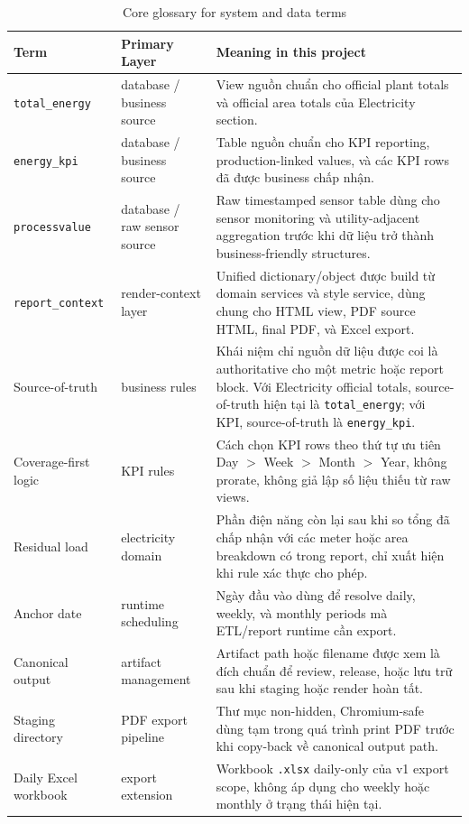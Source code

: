 \begin{table}[htbp]
	\centering
	\renewcommand{\arraystretch}{1.3}
	\caption{Core glossary for system and data terms}
	\label{tab:core_glossary_terms}
	\begin{tabularx}{\linewidth}{|>{\RaggedRight\arraybackslash}p{3.0cm}|>{\RaggedRight\arraybackslash}p{3.4cm}|>{\RaggedRight\arraybackslash}X|}
		\hline
		\textbf{Term} & \textbf{Primary Layer} & \textbf{Meaning in this project} \\ \hline
		\texttt{total\_energy} & database / business source & View nguồn chuẩn cho official plant totals và official area totals của Electricity section. \\ \hline
		\texttt{energy\_kpi} & database / business source & Table nguồn chuẩn cho KPI reporting, production-linked values, và các KPI rows đã được business chấp nhận. \\ \hline
		\texttt{processvalue} & database / raw sensor source & Raw timestamped sensor table dùng cho sensor monitoring và utility-adjacent aggregation trước khi dữ liệu trở thành business-friendly structures. \\ \hline
		\texttt{report\_context} & render-context layer & Unified dictionary/object được build từ domain services và style service, dùng chung cho HTML view, PDF source HTML, final PDF, và Excel export. \\ \hline
		Source-of-truth & business rules & Khái niệm chỉ nguồn dữ liệu được coi là authoritative cho một metric hoặc report block. Với Electricity official totals, source-of-truth hiện tại là \texttt{total\_energy}; với KPI, source-of-truth là \texttt{energy\_kpi}. \\ \hline
		Coverage-first logic & KPI rules & Cách chọn KPI rows theo thứ tự ưu tiên Day $>$ Week $>$ Month $>$ Year, không prorate, không giả lập số liệu thiếu từ raw views. \\ \hline
		Residual load & electricity domain & Phần điện năng còn lại sau khi so tổng đã chấp nhận với các meter hoặc area breakdown có trong report, chỉ xuất hiện khi rule xác thực cho phép. \\ \hline
		Anchor date & runtime scheduling & Ngày đầu vào dùng để resolve daily, weekly, và monthly periods mà ETL/report runtime cần export. \\ \hline
		Canonical output & artifact management & Artifact path hoặc filename được xem là đích chuẩn để review, release, hoặc lưu trữ sau khi staging hoặc render hoàn tất. \\ \hline
		Staging directory & PDF export pipeline & Thư mục non-hidden, Chromium-safe dùng tạm trong quá trình print PDF trước khi copy-back về canonical output path. \\ \hline
		Daily Excel workbook & export extension & Workbook \texttt{.xlsx} daily-only của v1 export scope, không áp dụng cho weekly hoặc monthly ở trạng thái hiện tại. \\ \hline
	\end{tabularx}
\end{table}

